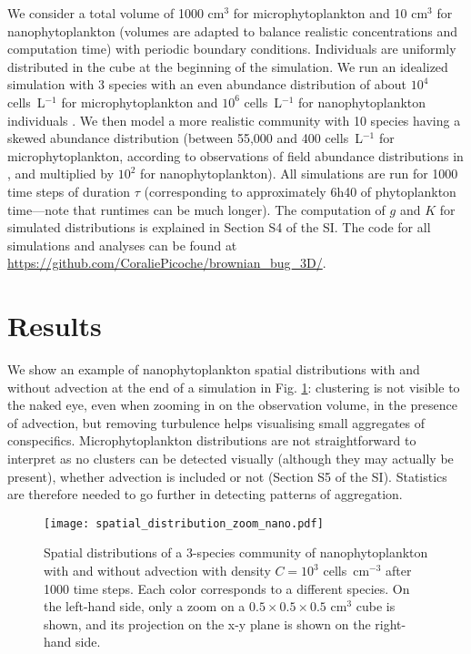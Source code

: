 \documentclass[12pt,english]{article}
\begin{document}
\medskip{}

We consider a total volume of 1000 cm$^{3}$ for microphytoplankton
and 10 cm$^{3}$ for nanophytoplankton (volumes are adapted to balance
realistic concentrations and computation time) with periodic boundary
conditions. Individuals are uniformly distributed in the cube at the
beginning of the simulation. We run an idealized simulation with 3
species with an even abundance distribution of about $10^{4}$ cells~L$^{-1}$
for microphytoplankton \citep{picoche_strong_2020} and $10^{6}$
cells~L$^{-1}$ for nanophytoplankton individuals \citep{edwards_mixotrophy_2019}.
We then model a more realistic community with 10 species having a
skewed abundance distribution (between 55,000 and 400 cells~L$^{-1}$
for microphytoplankton, according to observations of field abundance
distributions in \citealp{picoche_strong_2020}, and multiplied by
$10^{2}$ for nanophytoplankton). All simulations are run for 1000
time steps of duration $\tau$ (corresponding to approximately 6h40 of phytoplankton time---note that runtimes can be much longer). The computation of $g$ and $K$ for simulated distributions is explained in Section S4 of the SI. The code for all simulations and analyses can be found at \url{https://github.com/CoraliePicoche/brownian_bug_3D/}.

\section*{Results}

We show an example of nanophytoplankton spatial distributions with
and without advection at the end of a simulation in Fig. \ref{fig:Spatial-distributions}:
clustering is not visible to the naked eye, even when zooming in on
the observation volume, in the presence of advection, but removing
turbulence helps visualising small aggregates of conspecifics. Microphytoplankton distributions are not straightforward to interpret as no clusters can be detected visually (although they may actually be present), whether advection is included or not (Section S5 of the SI). Statistics are therefore needed to go further in detecting patterns of aggregation.

\begin{figure}[H]
\begin{centering}
\texttt{[image: spatial\_distribution\_zoom\_nano.pdf]} 
\par\end{centering}
\caption{Spatial distributions of a 3-species community of nanophytoplankton
with and without advection with density $C=10^{3}$ cells~cm$^{-3}$
after 1000 time steps. Each color corresponds to a different species.
On the left-hand side, only a zoom on a $0.5\times0.5\times0.5$ cm$^{3}$
cube is shown, and its projection on the x-y plane is shown on the
right-hand side. \label{fig:Spatial-distributions}}
\end{figure}
\end{document}
